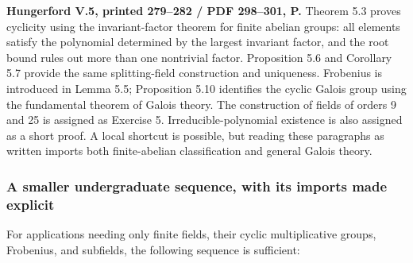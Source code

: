 \documentclass[
  11pt,
]{article}
\begin{document}
\textbf{Hungerford V.5, printed 279--282 / PDF 298--301, P.} Theorem 5.3
proves cyclicity using the invariant-factor theorem for finite abelian
groups: all elements satisfy the polynomial determined by the largest
invariant factor, and the root bound rules out more than one nontrivial
factor. Proposition 5.6 and Corollary 5.7 provide the same
splitting-field construction and uniqueness. Frobenius is introduced in
Lemma 5.5; Proposition 5.10 identifies the cyclic Galois group using the
fundamental theorem of Galois theory. The construction of fields of
orders 9 and 25 is assigned as Exercise 5. Irreducible-polynomial
existence is also assigned as a short proof. A local shortcut is
possible, but reading these paragraphs as written imports both
finite-abelian classification and general Galois theory.

\subsubsection{A smaller undergraduate sequence, with its imports made
explicit}\label{a-smaller-undergraduate-sequence-with-its-imports-made-explicit}

For applications needing only finite fields, their cyclic multiplicative
groups, Frobenius, and subfields, the following sequence is sufficient:
\end{document}
